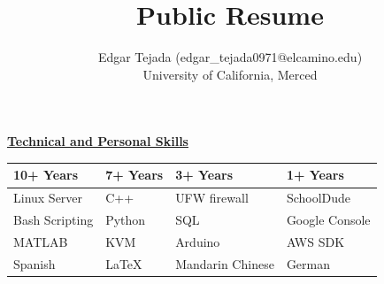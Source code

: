 \documentclass [11pt]{article}
\title{Public Resume}
\author{Edgar Tejada (edgar_tejada0971@elcamino.edu)\\University of California, Merced}
\begin{document}
\begin{flushleft}


\raggedright \underline{\textbf{Technical and Personal Skills}}
\linebreak
{
\centering
\begin{tabularx}{0.8\textwidth} { 
  | >{\centering\arraybackslash}X | 
  | >{\centering\arraybackslash}X | 
  | >{\centering\arraybackslash}X | 
  | >{\centering\arraybackslash}X |}

	\hline
	\textbf{10+ Years} & \textbf{7+ Years} & \textbf{3+ Years} & \textbf{1+ Years}\\ [0.5ex]
	\hline
	Linux Server & C++ & UFW firewall & SchoolDude \\ [0.5ex]
	\hline
	Bash Scripting & Python & SQL & Google Console\\ [0.5ex]
	\hline
	MATLAB & KVM & Arduino & AWS SDK\\ [0.5ex]
	\hline
	Spanish & \LaTeX & Mandarin Chinese & German\\ [0.5ex]
	\hline
\end{tabularx}

}
\raggedright


\end{flushleft}
\end{document}
